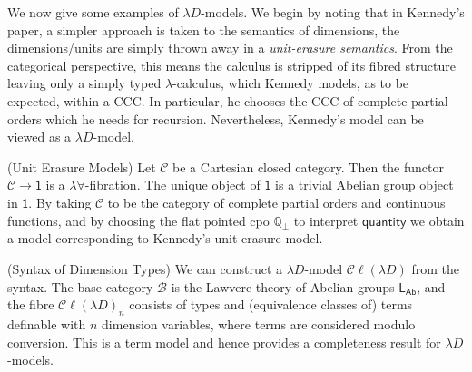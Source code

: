 \documentclass[a4paper,UKenglish]{lipics}
\newcommand{\ra}{\rightarrow}
\newcommand{\msf}[1]{\mathsf{#1}} %
\newcommand{\LAb}{\msf{L}_{\msf{Ab}}}
\newcommand{\terminal}{\msf{1}}
\newcommand{\ClLD}{\mathcal{C\ell}(\lambda{}D)} %
\newcommand{\B}{\mathcal{B}}
\newcommand{\C}{\mathcal{C}}
\newcommand{\bbQ}{\mathbb{Q}}
\newcommand{\qnt}{\msf{quantity}}
\begin{document}
We now give some examples of $\lambda D$-models. We begin by noting that in Kennedy's paper, a simpler approach is taken to the semantics of dimensions, the dimensions/units are simply thrown away in a {\em unit-erasure semantics}. From the categorical perspective, this means the calculus is stripped of its fibred structure leaving only a simply typed $\lambda$-calculus, which Kennedy models, as to be expected, within a CCC. In particular, he chooses the CCC of complete partial orders which he needs for recursion. Nevertheless, Kennedy's model can be viewed as a $\lambda D$-model.

\begin{example}(Unit Erasure Models)
\label{ex:UnitErasure}
Let $\C$ be a Cartesian closed category. Then the functor $\C \ra \terminal$ is a $\lambda\forall$-fibration. The unique object of $\terminal$ is a trivial Abelian group object in $\terminal$. By taking $\C$ to be the category of complete partial orders and continuous functions, and by choosing the flat pointed cpo $\bbQ_{\bot}$ to interpret $\qnt$ we obtain a model corresponding to Kennedy's unit-erasure model.
\end{example}


\begin{example}(Syntax of Dimension Types)
We can construct a $\lambda D$-model $\ClLD$ from the syntax. The base category $\B$ is the Lawvere theory of Abelian groups $\LAb$, and the fibre $\ClLD_n$ consists of types and (equivalence classes of) terms definable with $n$ dimension variables, where terms are considered modulo conversion. This is a term model and hence provides a completeness result for $\lambda D$-models.
\end{example}
\end{document}
